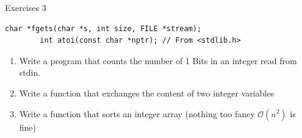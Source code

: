 \documentclass[english,compress]{beamer}
\begin{document}
\begin{frame}[fragile]{Exercises 3}
	\begin{lstlisting}[numbers=none]
		char *fgets(char *s, int size, FILE *stream);
		int atoi(const char *nptr); // From <stdlib.h>
	\end{lstlisting}
	\begin{enumerate}
		\item Write a program that counts the number of 1 Bits in an integer read from stdin.
		\item Write a function that exchanges the content of two integer variables
		\item Write a function that sorts an integer array (nothing too fancy $\mathcal O(n^2)$ is fine)
	\end{enumerate}
\end{frame}
\end{document}
